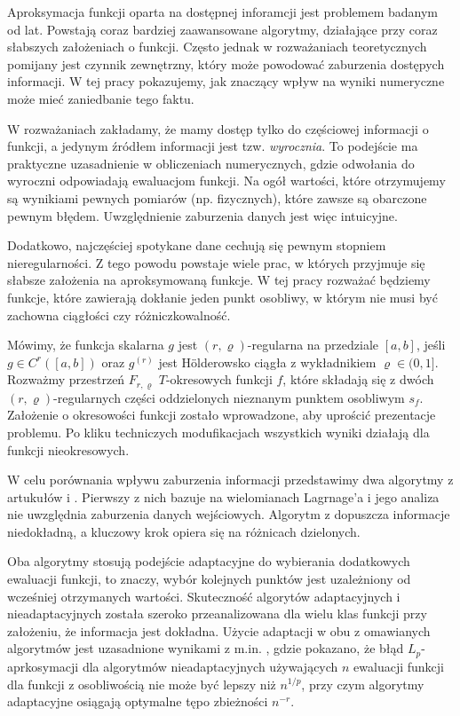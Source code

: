 \documentclass[oik, pdftex, robocza, man]{mgrwms}
\begin{document}
\begin{wstep}[Wprowadzenie]
    Aproksymacja funkcji oparta na dostępnej inforamcji jest problemem badanym od lat. Powstają coraz bardziej zaawansowane algorytmy, działające przy coraz słabszych założeniach o funkcji. Często jednak w rozważaniach teoretycznych pomijany jest czynnik zewnętrzny, który może powodować zaburzenia dostępych informacji. W tej pracy pokazujemy, jak znaczący wpływ na wyniki numeryczne może mieć zaniedbanie tego faktu.

    W rozważaniach zakładamy, że mamy dostęp tylko do częściowej informacji o funkcji, a jedynym źródłem informacji jest tzw. \textit{wyrocznia}. To podejście ma praktyczne uzasadnienie w obliczeniach numerycznych, gdzie odwołania do wyroczni odpowiadają ewaluacjom funkcji. Na ogół wartości, które otrzymujemy są wynikiami pewnych pomiarów (np. fizycznych), które zawsze są obarczone pewnym błędem. Uwzględnienie zaburzenia danych jest więc intuicyjne.
    
    Dodatkowo, najczęściej spotykane dane cechują się pewnym stopniem nieregularności. Z tego powodu powstaje wiele prac, w których przyjmuje się słabsze założenia na aproksymowaną funkcje. W tej pracy rozważać będziemy funkcje, które zawierają dokłanie jeden punkt osobliwy, w którym nie musi być zachowna ciągłości czy różniczkowalność.

    Mówimy, że funkcja skalarna $g$ jest $(r, \varrho)$-regularna na przedziale $[a,b]$, jeśli $g \in C^{r}([a,b])$ oraz $g^{(r)}$ jest Hölderowsko ciągła z wykładnikiem $\varrho \in (0,1]$. Rozważmy przestrzeń $F_{r,\varrho}$ $T$-okresowych funkcji $f$, które składają się z dwóch $(r,\varrho)$-regularnych części oddzielonych nieznanym punktem osobliwym $s_{f}$. Założenie o okresowości funkcji zostało wprowadzone, aby uprościć prezentacje problemu. Po kliku techniczych modufikacjach wszystkich wyniki działają dla funkcji nieokresowych.

    W celu porównania wpływu zaburzenia informacji przedstawimy dwa algorytmy z artukułów \cite{AoP} i \cite{CoDF}. Pierwszy z nich bazuje na wielomianach Lagrnage'a i jego analiza nie uwzględnia zaburzenia danych wejściowych. Algorytm z \cite{AoP} dopuszcza informacje niedokładną, a kluczowy krok opiera się na różnicach dzielonych. 

    Oba algorytmy stosują podejście adaptacyjne do wybierania dodatkowych ewaluacji funkcji, to znaczy, wybór kolejnych punktów jest uzależniony od wcześniej otrzymanych wartości. Skuteczność algorytów adaptacyjnych i nieadaptacyjnych została szeroko przeanalizowana dla wielu klas funkcji przy założeniu, że informacja jest dokładna. Użycie adaptacji w obu z omawianych algorytmów jest uzasadnione wynikami z m.in. \cite{PoA}, gdzie pokazano, że błąd $L_{p}$-aprkosymacji dla algorytmów nieadaptacyjnych używających $n$ ewaluacji funkcji dla funkcji z osobliwością nie może być lepszy niż $n^{1/p}$, przy czym algorytmy adaptacyjne osiągają optymalne tępo zbieżności $n^{-r}$.
    

\end{wstep}
\end{document}
